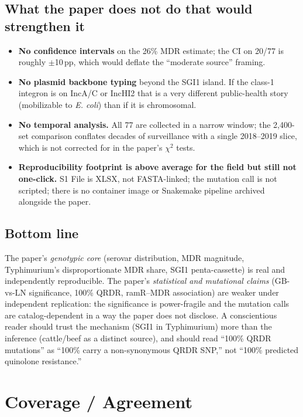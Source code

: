 \documentclass[11pt]{article}
\begin{document}
\subsection*{What the paper does not do that would strengthen it}
\begin{itemize}[leftmargin=*]
  \item \textbf{No confidence intervals} on the 26\% MDR estimate; the CI on 20/77 is roughly $\pm$10\,pp,
        which would deflate the ``moderate source'' framing.
  \item \textbf{No plasmid backbone typing} beyond the SGI1 island. If the class-1 integron is on IncA/C or
        IncHI2 that is a very different public-health story (mobilizable to \emph{E. coli}) than if it is
        chromosomal.
  \item \textbf{No temporal analysis.} All 77 are collected in a narrow window; the 2{,}400-set comparison
        conflates decades of surveillance with a single 2018--2019 slice, which is not corrected for in the
        paper's $\chi^2$ tests.
  \item \textbf{Reproducibility footprint is above average for the field but still not one-click.} S1 File
        is XLSX, not FASTA-linked; the mutation call is not scripted; there is no container image or Snakemake
        pipeline archived alongside the paper.
\end{itemize}

\subsection*{Bottom line}
The paper's \emph{genotypic core} (serovar distribution, MDR magnitude, Typhimurium's disproportionate MDR
share, SGI1 penta-cassette) is real and independently reproducible. The paper's \emph{statistical and
mutational claims} (GB-vs-LN significance, 100\% QRDR, ramR--MDR association) are weaker under independent
replication: the significance is power-fragile and the mutation calls are catalog-dependent in a way the paper
does not disclose. A conscientious reader should trust the mechanism (SGI1 in Typhimurium) more than the
inference (cattle/beef as a distinct source), and should read ``100\% QRDR mutations'' as
``100\% carry a non-synonymous QRDR SNP,'' not ``100\% predicted quinolone resistance.''

\section{Coverage / Agreement}
\end{document}
